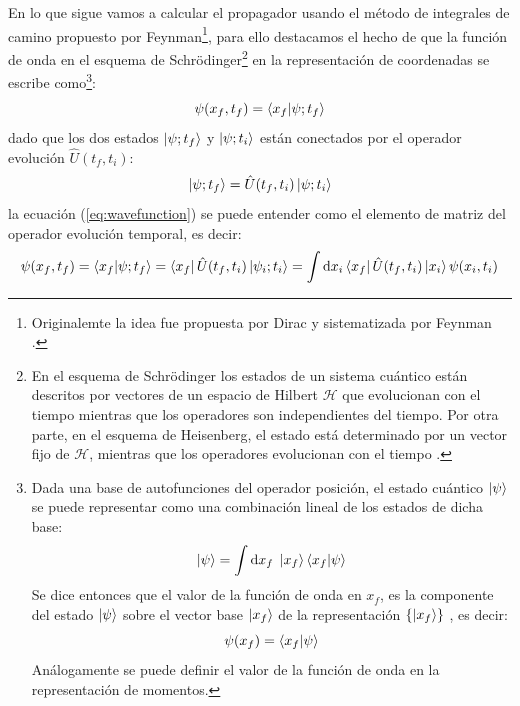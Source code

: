 \documentclass[11pt,a4paper]{article}
\begin{document}
En lo que sigue vamos a calcular el propagador usando el m\'etodo de integrales de camino propuesto por Feynman\footnote{Originalemte la idea fue propuesta por Dirac y sistematizada por Feynman \cite{schaposnik2014cuantica}.}, para ello destacamos el hecho de que la funci\'on de onda en el esquema de Schr\"odinger\footnote{En el esquema de Schr\"odinger los estados de un sistema cu\'antico est\'an descritos por vectores de un espacio de Hilbert $\mathcal{H}$ que evolucionan con el tiempo mientras que los operadores son independientes del tiempo. Por otra parte, en el esquema de Heisenberg, el estado est\'a determinado por un vector fijo de $\mathcal{H}$, mientras que los operadores evolucionan con el tiempo \cite{sakurai1995modern, falomir2021integrales, schaposnik2014cuantica}.} en la representaci\'on de coordenadas se escribe como\footnote{Dada una base de autofunciones del operador posición, el estado cu\'antico $\ket{\psi}$ se puede representar como una combinación lineal de los estados de dicha base:
\begin{equation}
\ket{\psi}= \int \mathrm{d}x_f \;\ket{x_f}\braket{x_f|\psi}
\label{eq:representation1}
\end{equation}
Se dice entonces que el valor de la funci\'on de onda en $x_f$, es la componente del estado $\ket{\psi}$ sobre el vector base $\ket{x_f}$ de la representaci\'on $\{ \ket{x_f} \}$ \cite{cohen1986quantum}, es decir:
\begin{equation}
\psi(x_f) = \braket{x_f|\psi}
\label{eq:representation2}
\end{equation}
An\'alogamente se puede definir el valor de la funci\'on de onda en la representaci\'on de momentos.}:
\begin{equation}
\psi(x_f,t_f) = \braket{x_f|\psi;t_f}
\label{eq:wavefunction}
\end{equation}
dado que los dos estados $\ket{\psi;t_f}$ y $\ket{\psi;t_i}$ est\'an conectados por el operador evoluci\'on $\hat{U}(t_f,t_i)$:
\begin{equation}
\ket{\psi;t_f} = \hat{U}(t_f,t_i)\ket{\psi;t_i}
\label{eq:evolution}
\end{equation}
la ecuaci\'on (\ref{eq:wavefunction}) se puede entender como el elemento de matriz del operador evoluci\'on temporal, es decir:
\begin{equation}
\psi(x_f,t_f) = \braket{x_f|\psi;t_f} = \bra{x_f}\hat{U}(t_f,t_i)\ket{\psi_i;t_i} = \int \mathrm{d}x_i \bra{x_f}\hat{U}(t_f,t_i)\ket{x_i}\psi(x_i,t_i) 
\label{eq:matrixelement}
\end{equation}
\end{document}
